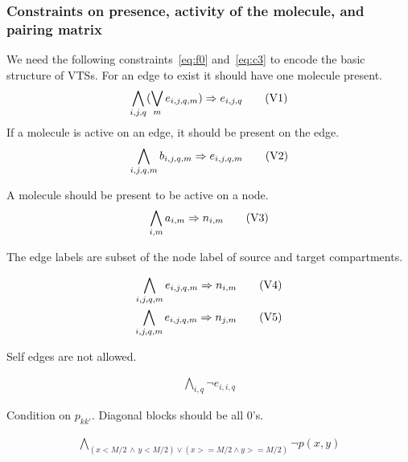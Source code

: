 \subsubsection{Constraints on presence, activity of the molecule, and pairing matrix}
%
We need the following constraints~\eqref{eq:f0} and~\eqref{eq:c3}
to encode the basic structure of VTSs.
%
For an edge to exist it should have one molecule present. 
%
\begin{align}
  \bigwedge\limits_{i,j,q} (\bigvee_m e_{i,j,q,m} )\Rightarrow e_{i,j,q}\tag{V1}\label{eq:f0}
\end{align}
If a molecule is active on an edge, it should be present on the edge.
%
\begin{align}
  \bigwedge\limits_{i,j,q,m} b_{i,j,q,m} \Rightarrow e_{i,j,q,m}\tag{V2}\label{eq:f1}
\end{align}

A molecule should be present to be active on a node.  
\begin{align}
  \bigwedge\limits_{i,m} a_{i,m} \Rightarrow n_{i,m}
  \tag{V3}\label{eq:c4}
\end{align}

The edge labels are subset of the node label of source and target compartments.

\begin{align}
  \bigwedge\limits_{i,j,q,m} e_{i,j,q,m} \Rightarrow n_{i,m}\tag{V4}\label{eq:c0}\\
  \bigwedge\limits_{i,j,q,m}  e_{i,j,q,m} \Rightarrow n_{j,m}\tag{V5}\label{eq:c1}
\end{align}


Self edges are not allowed. 

\begin{align}
   \bigwedge\limits_{i,q} \neg e_{i,i,q}\tag{V6}\label{eq:c2}
\end{align}

Condition on $p_{kk'}$.  Diagonal blocks should be all 0's.

\begin{align}
  \bigwedge\limits_{(x < M/2 \, \land  \, y < M/2) \lor  (x >= M/2 \land y >= M/2)} \neg p(x,y)
  \tag{V7}\label{eq:c3}
\end{align}

